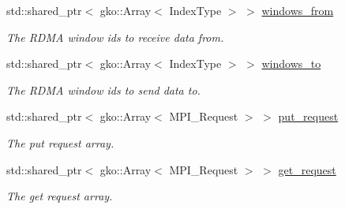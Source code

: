 \begin{DoxyCompactItemize}
\mbox{\label{structschwz_1_1Communicate_1_1comm__struct_a167c62a1a0cf2be8351e1ab65a264cf2}} 
std\+::shared\+\_\+ptr$<$ gko\+::\+Array$<$ Index\+Type $>$ $>$ \hyperlink{structschwz_1_1Communicate_1_1comm__struct_a167c62a1a0cf2be8351e1ab65a264cf2}{windows\+\_\+from}
\begin{DoxyCompactList}\small\item\em The R\+D\+MA window ids to receive data from. \end{DoxyCompactList}\item 
\mbox{\label{structschwz_1_1Communicate_1_1comm__struct_aef866f16ced557ba1496cffaf7c2473e}} 
std\+::shared\+\_\+ptr$<$ gko\+::\+Array$<$ Index\+Type $>$ $>$ \hyperlink{structschwz_1_1Communicate_1_1comm__struct_aef866f16ced557ba1496cffaf7c2473e}{windows\+\_\+to}
\begin{DoxyCompactList}\small\item\em The R\+D\+MA window ids to send data to. \end{DoxyCompactList}\item 
\mbox{\label{structschwz_1_1Communicate_1_1comm__struct_a9f135d4c33838027f8ed64a3ee18d42f}} 
std\+::shared\+\_\+ptr$<$ gko\+::\+Array$<$ M\+P\+I\+\_\+\+Request $>$ $>$ \hyperlink{structschwz_1_1Communicate_1_1comm__struct_a9f135d4c33838027f8ed64a3ee18d42f}{put\+\_\+request}
\begin{DoxyCompactList}\small\item\em The put request array. \end{DoxyCompactList}\item 
\mbox{\label{structschwz_1_1Communicate_1_1comm__struct_a91cc6e7d906fbb693e4dff2dee609c94}} 
std\+::shared\+\_\+ptr$<$ gko\+::\+Array$<$ M\+P\+I\+\_\+\+Request $>$ $>$ \hyperlink{structschwz_1_1Communicate_1_1comm__struct_a91cc6e7d906fbb693e4dff2dee609c94}{get\+\_\+request}
\begin{DoxyCompactList}\small\item\em The get request array. \end{DoxyCompactList}\item 
\mbox{\label{structschwz_1_1Communicate_1_1comm__struct_afc441e718856c45bd3cc462780886ca8}} 

\end{DoxyCompactItemize}
